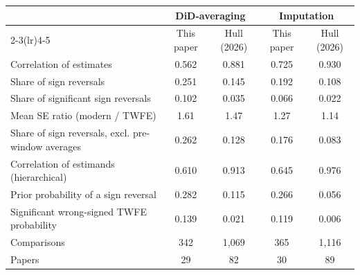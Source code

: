 \begin{tabular}{lcccc}
\toprule
 & \multicolumn{2}{c}{DiD-averaging} & \multicolumn{2}{c}{Imputation} \\
\cmidrule(lr){2-3}\cmidrule(lr){4-5}
 & This paper & Hull (2026) & This paper & Hull (2026) \\
\midrule
Correlation of estimates & 0.562 & 0.881 & 0.725 & 0.930 \\
Share of sign reversals & 0.251 & 0.145 & 0.192 & 0.108 \\
Share of significant sign reversals & 0.102 & 0.035 & 0.066 & 0.022 \\
Mean SE ratio (modern / TWFE) & 1.61 & 1.47 & 1.27 & 1.14 \\
Share of sign reversals, excl. pre-window averages & 0.262 & 0.128 & 0.176 & 0.083 \\
Correlation of estimands (hierarchical) & 0.610 & 0.913 & 0.645 & 0.976 \\
Prior probability of a sign reversal & 0.282 & 0.115 & 0.266 & 0.056 \\
Significant wrong-signed TWFE probability & 0.139 & 0.021 & 0.119 & 0.006 \\
\midrule
Comparisons & 342 & 1,069 & 365 & 1,116 \\
Papers & 29 & 82 & 30 & 89 \\
\bottomrule
\end{tabular}
